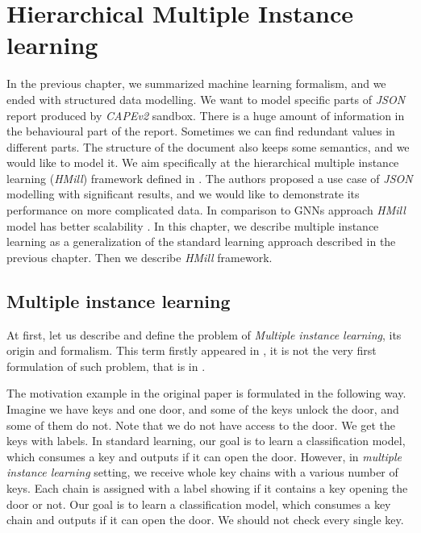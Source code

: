 \chapter{Hierarchical Multiple Instance learning} \label{chap:hmill}
In the previous chapter, we summarized machine learning formalism, and we ended with structured data modelling. We want to model specific parts of \emph{JSON} report produced by \emph{CAPEv2} sandbox. There is a huge amount of information in the behavioural part of the report. Sometimes we can find redundant values in different parts. The structure of the document also keeps some semantics, and we would like to model it. We aim specifically at the hierarchical multiple instance learning (\emph{HMill}) framework defined in \cite{Mandlik2020}. The authors proposed a use case of \emph{JSON} modelling with significant results, and we would like to demonstrate its performance on more complicated data. In comparison to GNNs approach \emph{HMill} model has better scalability \cite{Mandlik2020}.  In this chapter, we describe multiple instance learning as a generalization of the standard learning approach described in the previous chapter. Then we describe \emph{HMill} framework.


\section{Multiple instance learning}
At first, let us describe and define the problem of \emph{Multiple instance learning}, its origin and formalism. This term firstly appeared in \cite{Dietterich1997}, it is not the very first formulation of such problem, that is in \cite{Keeler1991}.

The motivation example in the original paper \cite{Dietterich1997} is formulated in the following way. Imagine we have keys and one door, and some of the keys unlock the door, and some of them do not. Note that we do not have access to the door. We get the keys with labels. In standard learning, our goal is to learn a classification model, which consumes a key and outputs if it can open the door. However, in \emph{multiple instance learning} setting, we receive whole key chains with a various number of keys. Each chain is assigned with a label showing if it contains a key opening the door or not. Our goal is to learn a classification model, which consumes a key chain and outputs if it can open the door. We should not check every single key.


